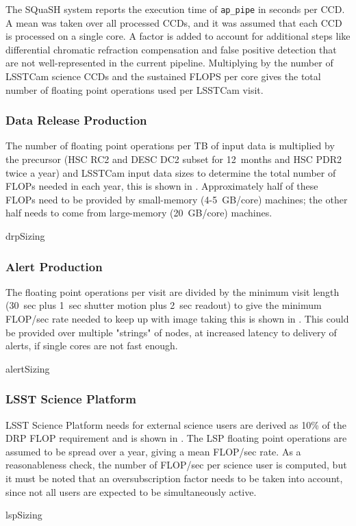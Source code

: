 The SQuaSH system reports the execution time of \texttt{ap\_pipe} in seconds per CCD.
A mean was taken over all processed CCDs, and it was assumed that each CCD is processed on a single core.
A factor is added to account for additional steps like differential chromatic refraction compensation and false positive detection that are not well-represented in the current pipeline.
Multiplying by the number of LSSTCam science CCDs and the sustained FLOPS per core gives the total number of floating point operations used per LSSTCam visit.

\subsubsection{Data Release Production}

The number of floating point operations per TB of input data is multiplied by the precursor (HSC RC2 and DESC DC2 subset for 12~months and HSC PDR2 twice a year) and LSSTCam input data sizes to determine the total number of FLOPs needed in each year, this is shown in .
Approximately half of these FLOPs need to be provided by small-memory (4-5~GB/core) machines; the other half needs to come from large-memory (20~GB/core) machines.

 {drpSizing}
\subsubsection{Alert Production}

The floating point operations per visit are divided by the minimum visit length (30~sec plus 1~sec shutter motion plus 2~sec readout) to give the minimum FLOP/sec rate needed to keep up with image taking this is shown in .
This could be provided over multiple "strings" of nodes, at increased latency to delivery of alerts, if single cores are not fast enough.

 {alertSizing}
\subsubsection{LSST Science Platform}

LSST Science Platform needs for external science users are derived as 10\% of the DRP FLOP requirement and is shown in .
The LSP floating point operations are assumed to be spread over a year, giving a mean FLOP/sec rate.
As a reasonableness check, the number of FLOP/sec per science user is computed, but it must be noted that an oversubscription factor needs to be taken into account, since not all users are expected to be simultaneously active.

 {lspSizing}

